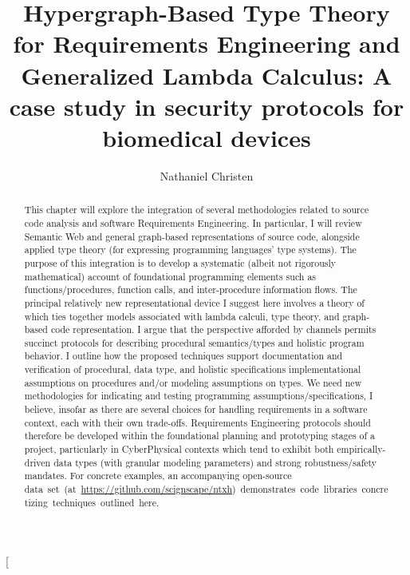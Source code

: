 \documentclass[11pt,twocolumn]{article}
\begin{document}
\title{Hypergraph-Based Type Theory for Requirements Engineering and
Generalized Lambda Calculus: A case study in security protocols 
for biomedical devices}
\author{Nathaniel Christen}
\twocolumn[\begin{@twocolumnfalse}
\maketitle{}
\begin{abstract}This chapter will explore the integration of several methodologies 
related to source code analysis and software Requirements 
Engineering.  In particular, I will review Semantic Web 
and general graph-based representations of source code, 
alongside applied type theory (for expressing 
programming languages' type systems).  The purpose of this 
integration is to develop a systematic (albeit not 
rigorously mathematical) account of foundational programming 
elements such as functions/procedures, function calls, and 
inter-procedure information flows.  The principal relatively new 
representational device I suggest here involves a theory 
of  which ties together models associated with 
lambda calculi, type theory, and graph-based code representation.  
I argue that the perspective afforded by channels permits 
succinct protocols for describing procedural 
semantics/types and holistic program behavior.  I 
outline how the proposed techniques support documentation and 
verification of procedural, data type, and holistic 
specifications \mdash{} implementational assumptions on procedures  
and/or modeling assumptions on types.   
We need new methodologies for indicating and testing 
programming assumptions/specifications, I believe, insofar as 
there are several choices for handling requirements in 
a software context, each with their own trade-offs.  
Requirements Engineering protocols should therefore 
be developed within the foundational planning and 
prototyping stages of a project, particularly
in CyberPhysical contexts which tend to exhibit both 
empirically-driven data types (with granular 
modeling parameters) and strong robustness/safety mandates.
For concrete examples, an accompanying open-source \mbox{data set (at
\url{https://github.com/scignscape/ntxh}) 
demonstrates code libraries concretizing 
techniques outlined here.}
\end{abstract} 
\newsavebox{\qboxii}

\end{@twocolumnfalse}
\end{document}
